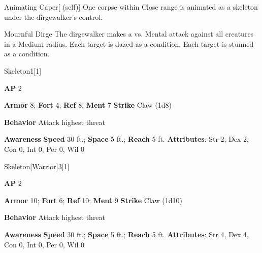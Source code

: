 \begin{attuneability}{Animating Caper}[ (self)]
One corpse within Close range is animated as a skeleton under the dirgewalker's control.
\end{attuneability}

\vspace{0.5em}
\begin{freeability}{Mournful Dirge}
The dirgewalker makes a  vs. Mental attack against all creatures in a Medium radius.
\hit Each target is dazed as a condition.
\crit Each target is stunned as a condition.
\end{freeability}

\begin{monsection}{Skeleton}{1}[1]
\vspace{-1em}\vspace{-1em}
\begin{spellcontent}
\begin{spelltargetinginfo}
{\textbf{AP} 2}

\pari \textbf{Armor} 8;
\textbf{Fort} 4;
\textbf{Ref} 8;
\textbf{Ment} 7
\pari \textbf{Strike} Claw  (1d8)



\pari \textbf{Behavior} Attack highest threat
\end{spelltargetinginfo}
\end{spellcontent}

\begin{monsterfooter}
\pari \textbf{Awareness} 
\pari \textbf{Speed} 30 ft.;
\textbf{Space} 5 ft.;
\textbf{Reach} 5 ft.
\pari \textbf{Attributes}:
Str 2,
Dex 2,
Con 0,
Int 0,
Per 0,
Wil 0
\end{monsterfooter}
\end{monsection}

\begin{monsection}{Skeleton}[Warrior]{3}[1]
\vspace{-1em}\vspace{-1em}
\begin{spellcontent}
\begin{spelltargetinginfo}
{\textbf{AP} 2}

\pari \textbf{Armor} 10;
\textbf{Fort} 6;
\textbf{Ref} 10;
\textbf{Ment} 9
\pari \textbf{Strike} Claw  (1d10)



\pari \textbf{Behavior} Attack highest threat
\end{spelltargetinginfo}
\end{spellcontent}

\begin{monsterfooter}
\pari \textbf{Awareness} 
\pari \textbf{Speed} 30 ft.;
\textbf{Space} 5 ft.;
\textbf{Reach} 5 ft.
\pari \textbf{Attributes}:
Str 4,
Dex 4,
Con 0,
Int 0,
Per 0,
Wil 0
\end{monsterfooter}
\end{monsection}

